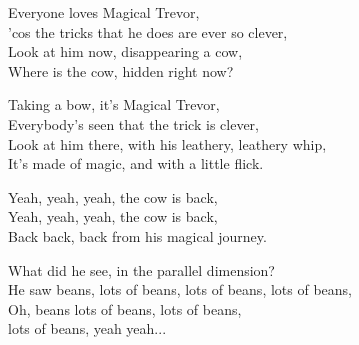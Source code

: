 \vspace{10pt}
Everyone loves Magical Trevor,\\
'cos the tricks that he does are ever so clever,\\
Look at him now, disappearing a cow,\\
Where is the cow, hidden right now?\par
\vspace{8pt}
Taking a bow, it's Magical Trevor,\\
Everybody's seen that the trick is clever,\\
Look at him there, with his leathery, leathery whip,\\
It's made of magic, and with a little flick.\par
\vspace{8pt}
Yeah, yeah, yeah, the cow is back,\\
Yeah, yeah, yeah, the cow is back,\\
Back back, back from his magical journey.\par
\vspace{8pt}
What did he see, in the parallel dimension?\\
He saw beans, lots of beans, lots of beans, lots of beans,\\
Oh, beans lots of beans, lots of beans,\\
lots of beans, yeah yeah...
